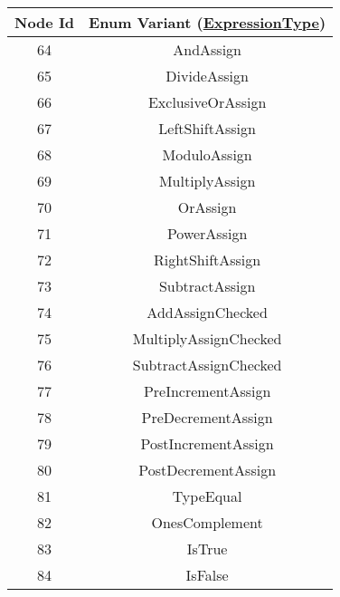 \documentclass[makeidx]{article}
\begin{document}
\begin{center}
\begin{table}
\begin{tabular}{|c|c|}
\end{tabular}
\begin{tabular}{|c|c|}
Node Id & Enum Variant (\hyperlink{https://docs.microsoft.com/en-us/dotnet/api/system.linq.expressions.expressiontype?view=net-6.0}{ExpressionType}) \\
\hline
64 & AndAssign \\
65 & DivideAssign \\
66 & ExclusiveOrAssign \\
67 & LeftShiftAssign \\
68 & ModuloAssign \\
69 & MultiplyAssign \\
70 & OrAssign \\
71 & PowerAssign \\
72 & RightShiftAssign \\
73 & SubtractAssign \\
74 & AddAssignChecked \\
75 & MultiplyAssignChecked \\
76 & SubtractAssignChecked \\
77 & PreIncrementAssign \\
78 & PreDecrementAssign \\
79 & PostIncrementAssign \\
80 & PostDecrementAssign \\
81 & TypeEqual \\
82 & OnesComplement \\
83 & IsTrue \\
84 & IsFalse
\end{tabular}
\end{table}
\end{center}
\end{document}
